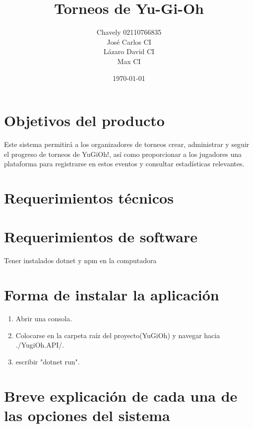 \documentclass[a4paper]{article}
\begin{document}
\title{Torneos de Yu-Gi-Oh}
\author{
  \begin{tabular}{c}
    Chavely 02110766835 \\
    Jos\'e Carlos CI \\
    L\'azaro David CI \\
    Max CI
  \end{tabular}
}
\date{\today}
\maketitle
\newpage

\section{Objetivos del producto}
Este sistema permitirá a los organizadores de torneos crear, administrar y seguir el progreso de torneos de
YuGiOh!, as\'i como proporcionar a los jugadores una plataforma para registrarse en estos eventos y consultar
estad\'isticas relevantes.

\newpage

\section{Requerimientos t\'ecnicos}

\newpage

\section{Requerimientos de software}
Tener instalados dotnet y npm en la computadora

\newpage

\section{Forma de instalar la aplicaci\'on}
\begin{enumerate}
\item Abrir una consola.
\item Colocarse en la carpeta ra\'iz del proyecto(YuGiOh) y navegar hacia ./YugiOh.API/.
\item escribir "dotnet run".
\end{enumerate}

\newpage

\section{Breve explicaci\'on de cada una de las opciones del sistema}
\end{document}

